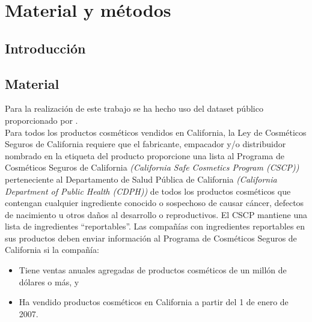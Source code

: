 
\chapter{Material y métodos} %
\label{chap:material-methods} %


\section{Introducción}






\section{Material}

Para la realización de este trabajo se ha hecho uso del dataset público  \citep{dataset} proporcionado por  \citep{healthdata}. \\

Para todos los productos cosméticos vendidos en California, la Ley de Cosméticos Seguros de California requiere que el fabricante, empacador y/o distribuidor nombrado en la etiqueta del producto proporcione una lista al Programa de Cosméticos Seguros de California \textit{(California Safe Cosmetics Program (CSCP))} perteneciente al Departamento de Salud Pública de California \textit{(California Department of Public Health (CDPH))} de todos los productos cosméticos que contengan cualquier ingrediente conocido o sospechoso de causar cáncer, defectos de nacimiento u otros daños al desarrollo o reproductivos. El CSCP mantiene una lista de ingredientes ``reportables''. Las compañías con ingredientes reportables en sus productos deben enviar información al Programa de Cosméticos Seguros de California si la compañía:

\begin{itemize}
 \item Tiene ventas anuales agregadas de productos cosméticos de un millón de dólares o más, y
 \item Ha vendido productos cosméticos en California a partir del 1 de enero de 2007.
\end{itemize}

